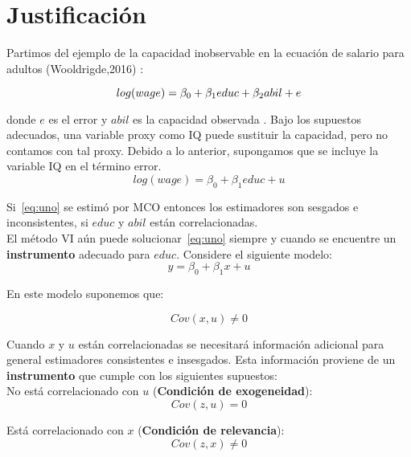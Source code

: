 \documentclass[a4paper,11pt]{book}
\begin{document}
\section{Justificación}

Partimos del ejemplo de la capacidad inobservable en la ecuación de salario para adultos (Wooldrigde,2016) :

\begin{equation}
\notag log(wage) = \beta_{0} + \beta_{1}educ + \beta_{2}abil + e
\end{equation}

donde $e$ es el error y $abil$ es la capacidad observada . Bajo los supuestos adecuados, una variable proxy como IQ puede sustituir la capacidad, pero no contamos con tal proxy. Debido a lo anterior, supongamos que se incluye la variable IQ en el término error.
\begin{equation}
\label{eq:uno}
log(wage) = \beta_{0} + \beta_{1}educ + u
\end{equation}

Si~\ref{eq:uno} se estimó por MCO entonces los estimadores son sesgados e inconsistentes, si $educ$ y $abil$ están correlacionadas.\\

El método VI aún puede solucionar~\ref{eq:uno} siempre y cuando se encuentre un \textbf{instrumento} adecuado para $educ$. Considere el siguiente modelo:\\

\begin{equation}
\label{eq:dos}
y = \beta_{0} + \beta_{1}x + u
\end{equation}

En este modelo suponemos que:

\begin{equation}
\label{eq:tres}
Cov(x,u) \not = 0
\end{equation}

Cuando $x$ y $u$ están correlacionadas se necesitará información adicional para general estimadores consistentes e insesgados. Esta información proviene de un \textbf{instrumento} que cumple con los siguientes supuestos:\\

No está correlacionado con $u$ (\textbf{Condición de exogeneidad}):
\begin{equation}
\label{eq:cuatro}
Cov(z,u) = 0
\end{equation}

Está correlacionado con $x$ (\textbf{Condición de relevancia}):
\begin{equation}
\label{eq:cinco}
Cov(z,x) \not = 0
\end{equation}
\end{document}
